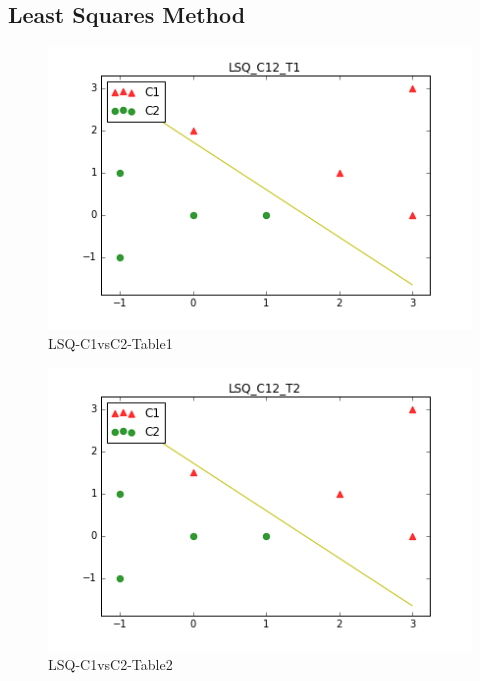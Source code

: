 \documentclass[10pt,a4paper]{article}
\begin{document}
\subsection{Least Squares Method}
\graphicspath{ {/images/} }
\begin{figure}[!h]
\includegraphics[scale=0.75]{images/LSQ_C12_T1.png}	
  \caption{LSQ-C1vsC2-Table1}
  \label{fig:LC12T1}
\end{figure}

\graphicspath{ {/images/} }
\begin{figure}[!h]
\includegraphics[scale=0.75]{images/LSQ_C12_T2.png}	
  \caption{LSQ-C1vsC2-Table2}
  \label{fig:LC12T2}
\end{figure}

\lstset{%
basicstyle=\small, %
identifierstyle=, %
stringstyle=\ttfamily, %
showstringspaces=false} %

\lstset{language=Python}          %
\end{document}
